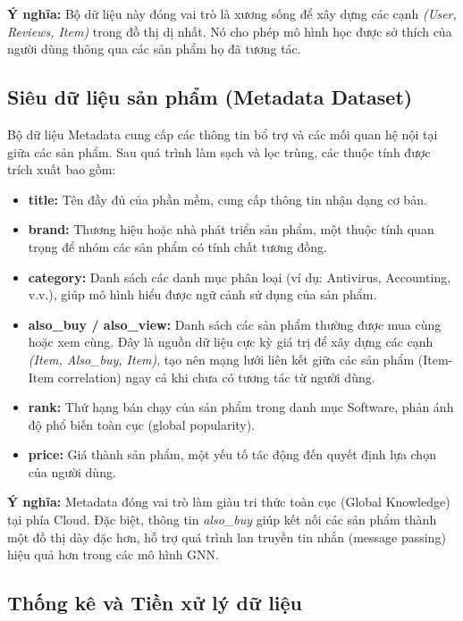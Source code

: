 \textbf{Ý nghĩa:} Bộ dữ liệu này đóng vai trò là xương sống để xây dựng các cạnh \textit{(User, Reviews, Item)} trong đồ thị dị nhất. Nó cho phép mô hình học được sở thích của người dùng thông qua các sản phẩm họ đã tương tác.

\subsection{Siêu dữ liệu sản phẩm (Metadata Dataset)}

Bộ dữ liệu Metadata cung cấp các thông tin bổ trợ và các mối quan hệ nội tại giữa các sản phẩm. Sau quá trình làm sạch và lọc trùng, các thuộc tính được trích xuất bao gồm:

\begin{itemize}
    \item \textbf{title:} Tên đầy đủ của phần mềm, cung cấp thông tin nhận dạng cơ bản.
    \item \textbf{brand:} Thương hiệu hoặc nhà phát triển sản phẩm, một thuộc tính quan trọng để nhóm các sản phẩm có tính chất tương đồng.
    \item \textbf{category:} Danh sách các danh mục phân loại (ví dụ: Antivirus, Accounting, v.v.), giúp mô hình hiểu được ngữ cảnh sử dụng của sản phẩm.
    \item \textbf{also\_buy / also\_view:} Danh sách các sản phẩm thường được mua cùng hoặc xem cùng. Đây là nguồn dữ liệu cực kỳ giá trị để xây dựng các cạnh \textit{(Item, Also\_buy, Item)}, tạo nên mạng lưới liên kết giữa các sản phẩm (Item-Item correlation) ngay cả khi chưa có tương tác từ người dùng.
    \item \textbf{rank:} Thứ hạng bán chạy của sản phẩm trong danh mục Software, phản ánh độ phổ biến toàn cục (global popularity).
    \item \textbf{price:} Giá thành sản phẩm, một yếu tố tác động đến quyết định lựa chọn của người dùng.
\end{itemize}

\textbf{Ý nghĩa:} Metadata đóng vai trò làm giàu tri thức toàn cục (Global Knowledge) tại phía Cloud. Đặc biệt, thông tin \textit{also\_buy} giúp kết nối các sản phẩm thành một đồ thị dày đặc hơn, hỗ trợ quá trình lan truyền tin nhắn (message passing) hiệu quả hơn trong các mô hình GNN.

\subsection{Thống kê và Tiền xử lý dữ liệu}

